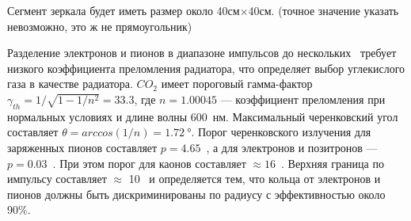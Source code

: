 Сегмент зеркала будет иметь размер около 40см$\times$40см. (точное значение указать невозможно, это ж не прямоугольник)



Разделение электронов и пионов в диапазоне импульсов до нескольких~\GeVoverC{} требует низкого коэффициента преломления радиатора, что определяет выбор углекислого газа в качестве радиатора. $CO_{2}$ имеет пороговый гамма-фактор $\gamma _{th} = 1 / \sqrt{1 - 1/n^{2}} = 33.3$, где $n = 1.00045$ --- коэффициент преломления при нормальных условиях и длине волны 600~нм. Максимальный черенковский угол составляет $\theta = arccos(1/n) = \SI{1.72}{\degree}$. Порог черенковского излучения для заряженных пионов составляет $p = 4.65$~\GeVoverC, а для электронов и позитронов --- $p = 0.03$~\GeVoverC. При этом порог для каонов составляет $\approx 16$~\GeVoverC. Верхняя граница по импульсу составляет $\approx$ 10~\GeVoverC{} и определяется тем, что кольца от электронов и пионов должны быть дискриминированы по радиусу с эффективностью около 90\%.



